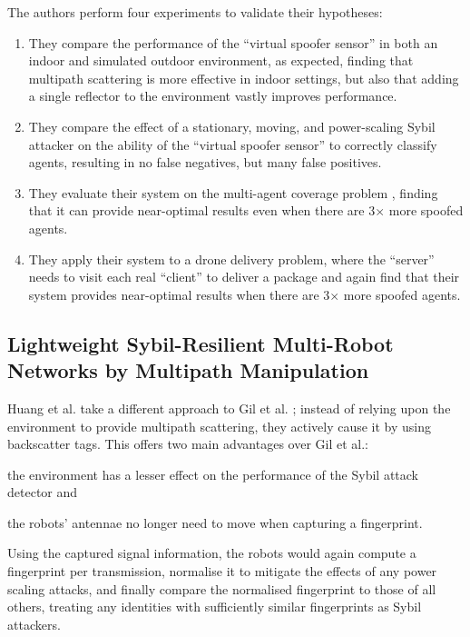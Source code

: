 The authors perform four experiments to validate their hypotheses:
\begin{enumerate}
    \item They compare the performance of the ``virtual spoofer sensor'' in both an indoor and simulated outdoor environment, as expected, finding that multipath scattering is more effective in indoor settings, but also that adding a single reflector to the environment vastly improves performance.
    \item They compare the effect of a stationary, moving, and power-scaling Sybil attacker on the ability of the ``virtual spoofer sensor'' to correctly classify agents, resulting in no false negatives, but many false positives.
    \item They evaluate their system on the multi-agent coverage problem \cite{MultiAgentCoverage}, finding that it can provide near-optimal results even when there are 3$\times$ more spoofed agents.
    \item They apply their system to a drone delivery problem, where the ``server'' needs to visit each real ``client'' to deliver a package and again find that their system provides near-optimal results when there are 3$\times$ more spoofed agents.
\end{enumerate}


\subsection{Lightweight Sybil-Resilient Multi-Robot Networks by Multipath Manipulation}
Huang et al. \cite{MultiPathManipulation} take a different approach to Gil et al. \cite{GuaranteeingSpoofResilience}; instead of relying upon the environment to provide multipath scattering, they actively cause it by using backscatter tags. This offers two main advantages over Gil et al.: \begin{enumerate*}
    \item the environment has a lesser effect on the performance of the Sybil attack detector and
    \item the robots' antennae no longer need to move when capturing a fingerprint.
\end{enumerate*}
Using the captured signal information, the robots would again compute a fingerprint per transmission, normalise it to mitigate the effects of any power scaling attacks, and finally compare the normalised fingerprint to those of all others, treating any identities with sufficiently similar fingerprints as Sybil attackers.

